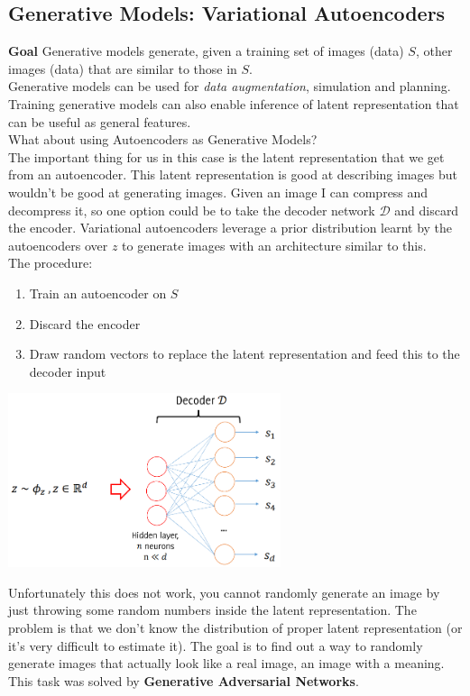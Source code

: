 \subsection{Generative Models: Variational Autoencoders}
\textbf{Goal} Generative models generate, given a training set of images (data) $S$, other images (data) that are similar to those in $S$. \\

Generative models can be used for \textit{data augmentation}, simulation and planning. \\
Training generative models can also enable inference of latent representation that can be useful as general features. \\

What about using Autoencoders as Generative Models? \\
The important thing for us in this case is the latent representation that we get from an autoencoder. This latent representation is good at describing images but wouldn't be good at generating images. Given an image I can compress and decompress it, so one option could be to take the decoder network $\mathcal{D}$ and discard the encoder. Variational autoencoders leverage a prior distribution learnt by the autoencoders over $z$ to generate images with an architecture similar to this. \\
The procedure: 
\begin{enumerate}
    \item Train an autoencoder on $S$
    \item Discard the encoder
    \item Draw random vectors to replace the latent representation and feed this to the decoder input
\end{enumerate}
\begin{center}
    \includegraphics[width=0.6\textwidth]{images/autogenerative.PNG}\par
\end{center}
Unfortunately this does not work, you cannot randomly generate an image by just throwing some random numbers inside the latent representation. The problem is that we don't know the distribution of proper latent representation (or it's very difficult to estimate it). The goal is to find out a way to randomly generate images that actually look like a real image, an image with a meaning. This task was solved by \textbf{Generative Adversarial Networks}.

